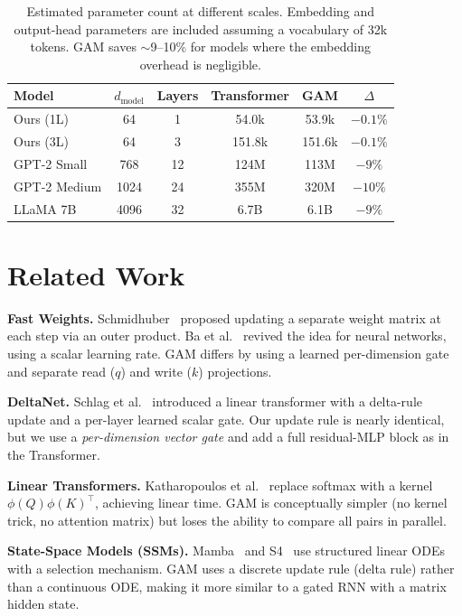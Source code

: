 \documentclass[11pt,a4paper]{article}
\begin{document}
\begin{table}[h]
\centering
\begin{tabular}{lccccc}
\toprule
Model & $d_\text{model}$ & Layers & Transformer & GAM & $\Delta$ \\
\midrule
Ours (1L) & 64 & 1 & 54.0k & 53.9k & $-0.1\%$ \\
Ours (3L) & 64 & 3 & 151.8k & 151.6k & $-0.1\%$ \\
GPT-2 Small & 768 & 12 & 124M & 113M & $-9\%$ \\
GPT-2 Medium & 1024 & 24 & 355M & 320M & $-10\%$ \\
LLaMA 7B & 4096 & 32 & 6.7B & 6.1B & $-9\%$ \\
\bottomrule
\end{tabular}
\caption{Estimated parameter count at different scales.  Embedding and
output-head parameters are included assuming a vocabulary of 32k tokens.
GAM saves $\sim$9--10\% for models where the embedding overhead is
negligible.}
\label{tab:scale}
\end{table}

\section{Related Work}
\label{sec:related}

\textbf{Fast Weights.}
Schmidhuber~\cite{schmidhuber1992learning} proposed updating a
separate weight matrix at each step via an outer product.
Ba et al.~\cite{ba2016using} revived the idea for neural networks,
using a scalar learning rate.  GAM differs by using a learned
per-dimension gate and separate read ($q$) and write ($k$) projections.

\textbf{DeltaNet.}
Schlag et al.~\cite{schlag2021linear} introduced a linear transformer
with a delta-rule update and a per-layer learned scalar gate.  Our
update rule is nearly identical, but we use a \emph{per-dimension
vector gate} and add a full residual-MLP block as in the Transformer.

\textbf{Linear Transformers.}
Katharopoulos et al.~\cite{katharopoulos2020transformers} replace
softmax with a kernel $\phi(Q)\phi(K)^\top$, achieving linear time.
GAM is conceptually simpler (no kernel trick, no attention matrix) but
loses the ability to compare all pairs in parallel.

\textbf{State-Space Models (SSMs).}
Mamba~\cite{gu2023mamba} and S4~\cite{gu2021efficiently} use
structured linear ODEs with a selection mechanism.  GAM uses a
discrete update rule (delta rule) rather than a continuous ODE,
making it more similar to a gated RNN with a matrix hidden state.
\end{document}
